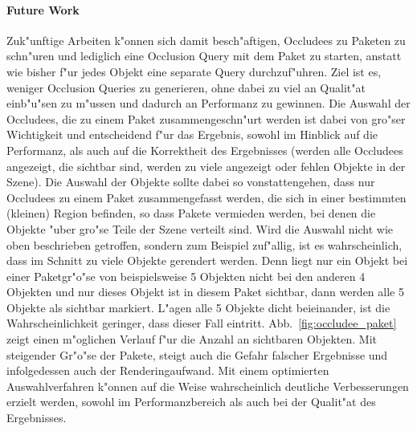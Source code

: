 \documentclass[journal]{vgtc}
\begin{document}
\paragraph{Future Work} Zuk"unftige Arbeiten k"onnen sich damit besch"aftigen, Occludees zu Paketen zu schn"uren und lediglich eine Occlusion Query mit dem Paket zu starten, anstatt wie bisher f"ur jedes Objekt eine separate Query durchzuf"uhren.
Ziel ist es, weniger Occlusion Queries zu generieren, ohne dabei zu viel an Qualit"at einb"u"sen zu m"ussen und dadurch an Performanz zu gewinnen.
Die Auswahl der Occludees, die zu einem Paket zusammengeschn"urt werden ist dabei von gro"ser Wichtigkeit und entscheidend f"ur das Ergebnis, sowohl im Hinblick auf die Performanz, als auch auf die Korrektheit des Ergebnisses (werden alle Occludees angezeigt, die sichtbar sind, werden zu viele angezeigt oder fehlen Objekte in der Szene).
Die Auswahl der Objekte sollte dabei so vonstattengehen, dass nur Occludees zu einem Paket zusammengefasst werden, die sich in einer bestimmten (kleinen) Region befinden, so dass Pakete vermieden werden, bei denen die Objekte "uber gro"se Teile der Szene verteilt sind.
Wird die Auswahl nicht wie oben beschrieben getroffen, sondern zum Beispiel zuf"allig, ist es wahrscheinlich, dass im Schnitt zu viele Objekte gerendert werden. Denn liegt nur ein Objekt bei einer Paketgr"o"se von beispielsweise 5 Objekten nicht bei den anderen 4 Objekten und nur dieses Objekt ist in diesem Paket sichtbar, dann werden alle 5 Objekte als sichtbar markiert. L"agen alle 5 Objekte dicht beieinander, ist die Wahrscheinlichkeit geringer, dass dieser Fall eintritt.
Abb.\ \ref{fig:occludee_paket} zeigt einen m"oglichen Verlauf f"ur die Anzahl an sichtbaren Objekten. 
Mit steigender Gr"o"se der Pakete, steigt auch die Gefahr falscher Ergebnisse und infolgedessen auch der Renderingaufwand.
Mit einem optimierten Auswahlverfahren k"onnen auf die Weise wahrscheinlich deutliche Verbesserungen erzielt werden, sowohl im Performanzbereich als auch bei der Qualit"at des Ergebnisses. 



 

\end{document}
